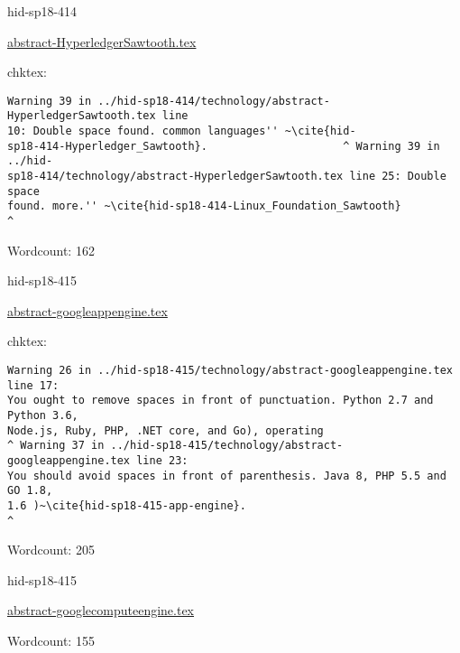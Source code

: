 \begin{IU}

hid-sp18-414

\href{https://github.com/cloudmesh-community/hid-sp18-414/blob/master//technology/abstract-HyperledgerSawtooth.tex}{abstract-HyperledgerSawtooth.tex}

 
chktex:
\begin{tiny}
\begin{verbatim}
Warning 39 in ../hid-sp18-414/technology/abstract-HyperledgerSawtooth.tex line
10: Double space found. common languages'' ~\cite{hid-
sp18-414-Hyperledger_Sawtooth}.                     ^ Warning 39 in ../hid-
sp18-414/technology/abstract-HyperledgerSawtooth.tex line 25: Double space
found. more.'' ~\cite{hid-sp18-414-Linux_Foundation_Sawtooth}          ^
\end{verbatim}
\end{tiny}

Wordcount: 162

\end{IU}



\begin{IU}

hid-sp18-415

\href{https://github.com/cloudmesh-community/hid-sp18-415/blob/master//technology/abstract-googleappengine.tex}{abstract-googleappengine.tex}

 
chktex:
\begin{tiny}
\begin{verbatim}
Warning 26 in ../hid-sp18-415/technology/abstract-googleappengine.tex line 17:
You ought to remove spaces in front of punctuation. Python 2.7 and Python 3.6,
Node.js, Ruby, PHP, .NET core, and Go), operating
^ Warning 37 in ../hid-sp18-415/technology/abstract-googleappengine.tex line 23:
You should avoid spaces in front of parenthesis. Java 8, PHP 5.5 and GO 1.8,
1.6 )~\cite{hid-sp18-415-app-engine}.                                     ^
\end{verbatim}
\end{tiny}

Wordcount: 205

\end{IU}



\begin{IU}

hid-sp18-415

\href{https://github.com/cloudmesh-community/hid-sp18-415/blob/master//technology/abstract-googlecomputeengine.tex}{abstract-googlecomputeengine.tex}

 

Wordcount: 155

\end{IU}

